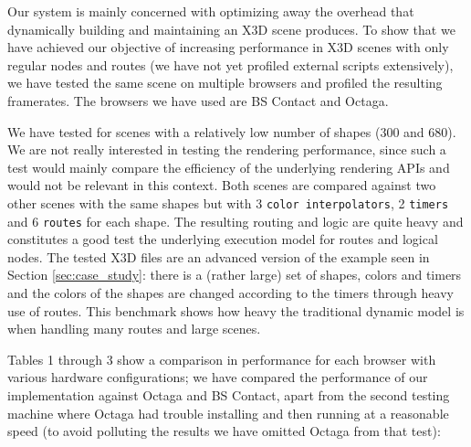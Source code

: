 
Our system is mainly concerned with optimizing away the overhead that dynamically building and maintaining an X3D scene produces. To show that we have achieved our objective of increasing performance in X3D scenes with only regular nodes and routes (we have not yet profiled external scripts extensively), we have tested the same scene on multiple browsers and profiled the resulting framerates. The browsers we have used are BS Contact and Octaga.

We have tested for scenes with a relatively low number of shapes (300 and 680). We are not really interested in testing the rendering performance, since such a test would mainly compare the efficiency of the underlying rendering APIs and would not be relevant in this context. Both scenes are compared against two other scenes with the same shapes but with 3 \texttt{color interpolators}, 2 \texttt{timers} and 6 \texttt{routes} for each shape. The resulting routing and logic are quite heavy and constitutes a good test the underlying execution model for routes and logical nodes. The tested X3D files are an advanced version of the example seen in Section \ref{sec:case_study}: there is a (rather large) set of shapes, colors and timers and the colors of the shapes are changed according to the timers through heavy use of routes. This benchmark shows how heavy the traditional dynamic model is when handling many routes and large scenes.

Tables 1 through 3 show a comparison in performance for each browser with various hardware configurations; we have compared the performance of our implementation against Octaga and BS Contact, apart from the second testing machine where Octaga had trouble installing and then running at a reasonable speed (to avoid polluting the results we have omitted Octaga from that test):

